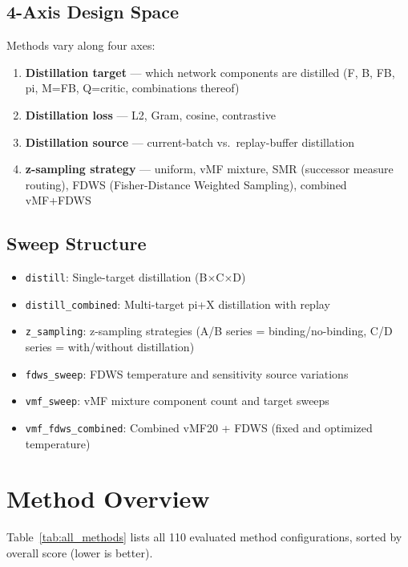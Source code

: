 \documentclass[11pt,a4paper]{article}
\begin{document}
\subsection{4-Axis Design Space}
Methods vary along four axes:
\begin{enumerate}
    \item[\textbf{B:}] \textbf{Distillation target} --- which network components are distilled
    (F, B, FB, pi, M=FB, Q=critic, combinations thereof)
    \item[\textbf{C:}] \textbf{Distillation loss} --- L2, Gram, cosine, contrastive
    \item[\textbf{D:}] \textbf{Distillation source} --- current-batch vs.\ replay-buffer distillation
    \item[\textbf{E:}] \textbf{z-sampling strategy} --- uniform, vMF mixture, SMR (successor measure routing),
    FDWS (Fisher-Distance Weighted Sampling), combined vMF+FDWS
\end{enumerate}

\subsection{Sweep Structure}
\begin{itemize}
    \item \texttt{distill}: Single-target distillation (B$\times$C$\times$D)
    \item \texttt{distill\_combined}: Multi-target pi+X distillation with replay
    \item \texttt{z\_sampling}: z-sampling strategies (A/B series = binding/no-binding, C/D series = with/without distillation)
    \item \texttt{fdws\_sweep}: FDWS temperature and sensitivity source variations
    \item \texttt{vmf\_sweep}: vMF mixture component count and target sweeps
    \item \texttt{vmf\_fdws\_combined}: Combined vMF20 + FDWS (fixed and optimized temperature)
\end{itemize}

\section{Method Overview}

Table~\ref{tab:all_methods} lists all 110 evaluated method configurations,
sorted by overall score (lower is better).
\end{document}
